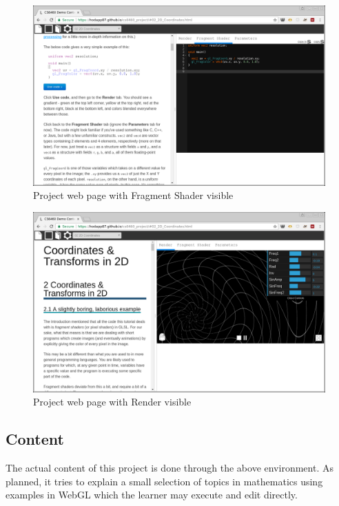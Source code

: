 \documentclass{sig-alternate-05-2015}
\begin{document}
\begin{figure}
  \includegraphics[width=\textwidth]{screenshot_editor.png}
  \caption{Project web page with Fragment Shader visible}
  \label{fig:editor}
\end{figure}

\begin{figure}
  \includegraphics[width=\textwidth]{screenshot_render.png}
  \caption{Project web page with Render visible}
  \label{fig:render}
\end{figure}

\subsection{Content}

The actual content of this project is done through the above
environment.  As planned, it tries to explain a small selection of
topics in mathematics using examples in WebGL which the learner may
execute and edit directly.
\end{document}
